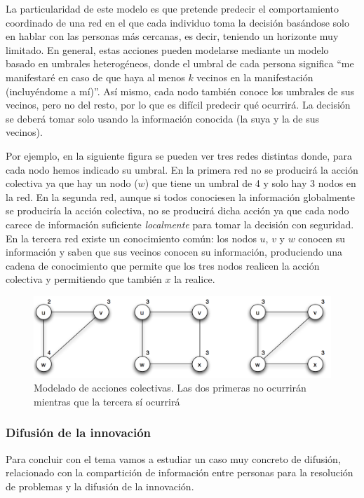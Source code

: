 \documentclass[]{article}
\begin{document}
La particularidad de este modelo es que pretende predecir el
comportamiento coordinado de una red en el que cada individuo toma la
decisión basándose solo en hablar con las personas más cercanas, es
decir, teniendo un horizonte muy limitado. En general, estas acciones
pueden modelarse mediante un modelo basado en umbrales heterogéneos,
donde el umbral de cada persona significa ``me manifestaré en caso de
que haya al menos \(k\) vecinos en la manifestación (incluyéndome a
mí)''. Así mismo, cada nodo también conoce los umbrales de sus vecinos,
pero no del resto, por lo que es difícil predecir qué ocurrirá. La
decisión se deberá tomar solo usando la información conocida (la suya y
la de sus vecinos).

Por ejemplo, en la siguiente figura se pueden ver tres redes distintas
donde, para cada nodo hemos indicado su umbral. En la primera red no se
producirá la acción colectiva ya que hay un nodo (\(w\)) que tiene un
umbral de 4 y solo hay 3 nodos en la red. En la segunda red, aunque si
todos conociesen la información globalmente se produciría la acción
colectiva, no se producirá dicha acción ya que cada nodo carece de
información suficiente \emph{localmente} para tomar la decisión con
seguridad. En la tercera red existe un conocimiento común: los nodos
\(u\), \(v\) y \(w\) conocen su información y saben que sus vecinos
conocen su información, produciendo una cadena de conocimiento que
permite que los tres nodos realicen la acción colectiva y permitiendo
que también \(x\) la realice.

\begin{figure}[htbp]
\centering
\includegraphics{../images/tema08/accionColectiva.png}
\caption{Modelado de acciones colectivas. Las dos primeras no ocurrirán
mientras que la tercera sí ocurrirá}
\end{figure}

\subsubsection{Difusión de la
innovación}\label{difusiuxf3n-de-la-innovaciuxf3n}

Para concluir con el tema vamos a estudiar un caso muy concreto de
difusión, relacionado con la compartición de información entre personas
para la resolución de problemas y la difusión de la innovación.
\end{document}
